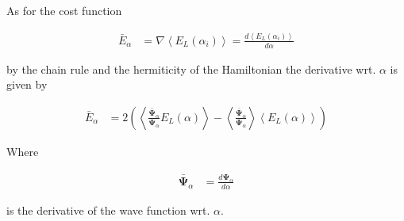 As for the cost function 

\begin{align}
    \bar{E}_\alpha &= \nabla \left\langle E_L (\alpha_i) \right\rangle = \frac{d\left\langle E_L (\alpha_i) \right\rangle}{d\alpha}
\end{align}

by the chain rule and the hermiticity of the Hamiltonian the derivative wrt. $\alpha$ is given by

\begin{align}
    \bar{E}_\alpha &= 2\left( \left\langle \frac{\bar{\mathbf{\Psi}}_\alpha}{\mathbf{\Psi}_\alpha} E_L(\alpha) \right\rangle - \left\langle \frac{\bar{\mathbf{\Psi}}_\alpha}{\mathbf{\Psi}_\alpha}  \right\rangle \left\langle E_L(\alpha) \right\rangle \right)
\end{align}

Where

\begin{align}
    \bar{\mathbf{\Psi}}_\alpha &= \frac{d \mathbf{\Psi}_\alpha}{d\alpha}
\end{align}

is the derivative of the wave function wrt. $\alpha$. 

